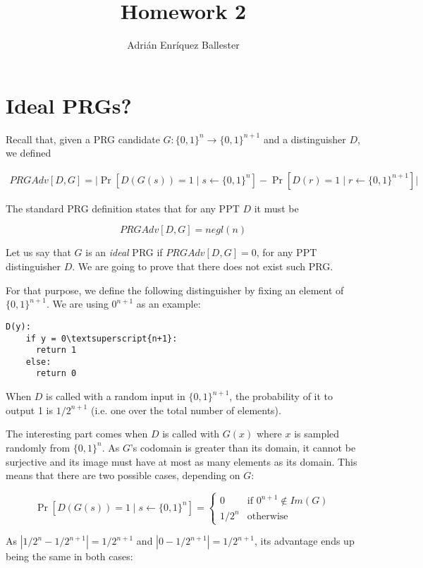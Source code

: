 \documentclass{article}
\title{Homework 2}
\author{Adrián Enríquez Ballester}
\newcommand{\zo}{\{0,1\}}
\begin{document}
\maketitle

\section{Ideal PRGs?}

Recall that, given a PRG candidate $G:\zo^n \to \zo^{n+1}$ and a
distinguisher $D$, we defined

\begin{align*}
  PRGAdv[D, G] = 
    \Big| 
      \Pr[D(G(s))=1\mid s\gets \zo^n] -
      \Pr[D(r) = 1 \mid r\gets \zo^{n+1}] 
    \Big|
\end{align*}

The standard PRG definition states that for any PPT $D$ it must be

$$PRGAdv[D, G]=negl(n)$$

Let us say that $G$ is an {\em ideal} PRG if 
$PRGAdv[D,G] = 0$, for any PPT distinguisher $D$.
We are going to prove that there does not exist such PRG.

For that purpose, we define the following distinguisher by fixing an 
element of $\zo^{n+1}$. We are using $0^{n+1}$ as an example:

\begin{Verbatim}[commandchars=\\\{\},codes={\catcode`$=3\catcode`_=8}]
  D(y):
    if y = 0\textsuperscript{n+1}:
      return 1
    else:
      return 0
  \end{Verbatim}

When $D$ is called with a random input in $\zo^{n+1}$, the probability
of it to output 1 is $1 / 2^{n+1}$ (i.e. one over the total number of 
elements).

The interesting part comes when $D$ is called with $G(x)$ where 
$x$ is sampled randomly from $\zo^n$. As $G$'s codomain is greater
than its domain, it cannot be surjective and its image must have 
at most as many elements as its domain. This means that there are 
two possible cases, depending on $G$:

$$
  \Pr[D(G(s))=1\mid s\gets \zo^n] = 
    \begin{cases}
      0 &\text{if } 0^{n+1} \notin Im(G) \\
      1 / 2^n &\text{otherwise}
    \end{cases}
$$

As $| 1/2^n - 1/2^{n + 1} | = 1/2^{n + 1}$ and 
$| 0 - 1/2^{n + 1} | = 1/2^{n + 1}$, its advantage ends up being 
the same in both cases:
\end{document}
